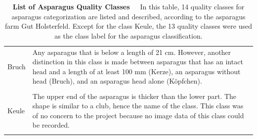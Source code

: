 \begin{table}[h]
{\begin{tabular}{l p{14cm}}
		Bruch & Any asparagus that is below a length of 21 cm. However, another 						distinction in this class is made between asparagus that has an intact head and 		a length of at least 100 mm (Kerze),  an asparagus without head (Bruch), and an 				asparagus head alone (Köpfchen). \\
		\\
		Keule & The upper end of the asparagus is thicker than the lower part. The shape 				is similar to a club, hence the name of the class. This class was of no concern 		to the project because no image data of this class could be recorded. \\
		\\
		\hline
	\end{tabular}%
	}
	\caption[List of Asparagus Quality Classes]{\textbf{List of Asparagus Quality Classes}~~~In this table, 14 quality classes for asparagus categorization are listed and described, according to the asparagus farm Gut Holsterfeld. Except for the class Keule, the 13 quality classes were used as the class label for the asparagus classification.}
	\label{tab:AsparagusLabels}
\end{table}


